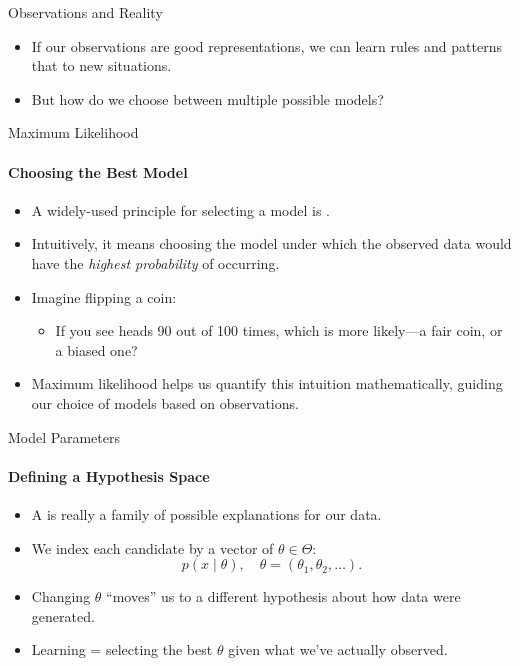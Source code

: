 \begin{frame}{Observations and Reality}
  \begin{itemize}
    \item If our observations are good representations, we can learn rules and patterns that  to new situations.
    \item But how do we choose between multiple possible models?
  \end{itemize}
\end{frame}

\begin{frame}{Maximum Likelihood}
  \framesubtitle{Choosing the Best Model}
  \begin{itemize}
    \item A widely-used principle for selecting a model is .
    \item Intuitively, it means choosing the model under which the observed data would have the \emph{highest probability} of occurring.
    \item Imagine flipping a coin:
          \begin{itemize}
            \item If you see heads 90 out of 100 times, which is more likely—a fair coin, or a biased one?
          \end{itemize}
    \item Maximum likelihood helps us quantify this intuition mathematically, guiding our choice of models based on observations.
  \end{itemize}
\end{frame}

\begin{frame}{Model Parameters}
  \framesubtitle{Defining a Hypothesis Space}
  \begin{itemize}
    \item A  is really a family of possible explanations for our data.
    \item We index each candidate by a vector of  $\theta\in\Theta$:
          \[
            p(x \mid \theta), \quad \theta = (\theta_1, \theta_2, \dots).
          \]
    \item Changing $\theta$ “moves” us to a different hypothesis about how data were generated.
    \item Learning = selecting the best $\theta$ given what we've actually observed.
  \end{itemize}
\end{frame}

